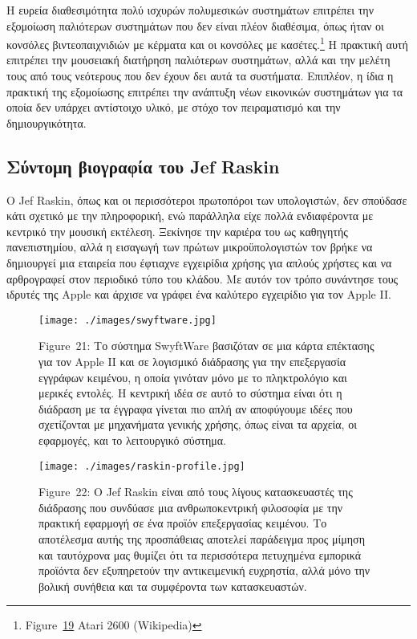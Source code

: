 \documentclass[
]{article}
\begin{document}
Η ευρεία διαθεσιμότητα πολύ ισχυρών πολυμεσικών συστημάτων επιτρέπει την
εξομοίωση παλιότερων συστημάτων που δεν είναι πλέον διαθέσιμα, όπως ήταν
οι κονσόλες βιντεοπαιχνιδιών με κέρματα και οι κονσόλες με
κασέτες.\footnote{Figure~\protect\hyperlink{fig:atari-2600}{19} Atari
  2600 (Wikipedia)} Η πρακτική αυτή επιτρέπει την μουσειακή διατήρηση
παλιότερων συστημάτων, αλλά και την μελέτη τους από τους νεότερους που
δεν έχουν δει αυτά τα συστήματα. Επιπλέον, η ίδια η πρακτική της
εξομοίωσης επιτρέπει την ανάπτυξη νέων εικονικών συστημάτων για τα οποία
δεν υπάρχει αντίστοιχο υλικό, με στόχο τον πειραματισμό και την
δημιουργικότητα.

\hypertarget{ux3c3ux3cdux3bdux3c4ux3bfux3bcux3b7-ux3b2ux3b9ux3bfux3b3ux3c1ux3b1ux3c6ux3afux3b1-ux3c4ux3bfux3c5-jef-raskin}{%
\subsection{Σύντομη βιογραφία του Jef
Raskin}\label{ux3c3ux3cdux3bdux3c4ux3bfux3bcux3b7-ux3b2ux3b9ux3bfux3b3ux3c1ux3b1ux3c6ux3afux3b1-ux3c4ux3bfux3c5-jef-raskin}}

Ο Jef Raskin, όπως και οι περισσότεροι πρωτοπόροι των υπολογιστών, δεν
σπούδασε κάτι σχετικό με την πληροφορική, ενώ παράλληλα είχε πολλά
ενδιαφέροντα με κεντρικό την μουσική εκτέλεση. Ξεκίνησε την καριέρα του
ως καθηγητής πανεπιστημίου, αλλά η εισαγωγή των πρώτων μικροϋπολογιστών
τον βρήκε να δημιουργεί μια εταιρεία που έφτιαχνε εγχειρίδια χρήσης για
απλούς χρήστες και να αρθρογραφεί στον περιοδικό τύπο του κλάδου. Με
αυτόν τον τρόπο συνάντησε τους ιδρυτές της Apple και άρχισε να γράφει
ένα καλύτερο εγχειρίδιο για τον Apple II.

\leavevmode{}%
\begin{figure}
\hypertarget{fig:swyftware}{%
\centering
\texttt{[image: ./images/swyftware.jpg]}
\caption{Figure~21: Το σύστημα SwyftWare βασιζόταν σε μια κάρτα
επέκτασης για τον Apple II και σε λογισμικό διάδρασης για την
επεξεργασία εγγράφων κειμένου, η οποία γινόταν μόνο με το πληκτρολόγιο
και μερικές εντολές. Η κεντρική ιδέα σε αυτό το σύστημα είναι ότι η
διάδραση με τα έγγραφα γίνεται πιο απλή αν αποφύγουμε ιδέες που
σχετίζονται με μηχανήματα γενικής χρήσης, όπως είναι τα αρχεία, οι
εφαρμογές, και το λειτουργικό σύστημα.}\label{fig:swyftware}
}
\end{figure}

\leavevmode{}%
\begin{figure}
\hypertarget{fig:raskin-profile}{%
\centering
\texttt{[image: ./images/raskin-profile.jpg]}
\caption{Figure~22: Ο Jef Raskin είναι από τους λίγους κατασκευαστές της
διάδρασης που συνδύασε μια ανθρωποκεντρική φιλοσοφία με την πρακτική
εφαρμογή σε ένα προϊόν επεξεργασίας κειμένου. Το αποτέλεσμα αυτής της
προσπάθειας αποτελεί παράδειγμα προς μίμηση και ταυτόχρονα μας θυμίζει
ότι τα περισσότερα πετυχημένα εμπορικά προϊόντα δεν εξυπηρετούν την
αντικειμενική ευχρηστία, αλλά μόνο την βολική συνήθεια και τα συμφέροντα
των κατασκευαστών.}\label{fig:raskin-profile}
}
\end{figure}
\end{document}
